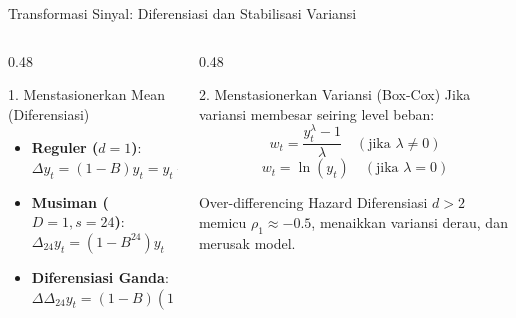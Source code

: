 \documentclass[aspectratio=169, 10pt]{beamer}
\begin{document}
\begin{frame}{Transformasi Sinyal: Diferensiasi dan Stabilisasi Variansi}
    \begin{columns}[T]
        \begin{column}{0.48\textwidth}
            \begin{block}{1. Menstasionerkan Mean (Diferensiasi)}
                \begin{itemize}
                    \item \textbf{Reguler ($d=1$)}: $\Delta y_t = (1-B)y_t = y_t - y_{t-1}$
                    \item \textbf{Musiman ($D=1, s=24$)}: $\Delta_{24} y_t = (1-B^{24})y_t$
                    \item \textbf{Diferensiasi Ganda}: $\Delta \Delta_{24} y_t = (1-B)(1-B^{24})y_t$
                \end{itemize}
            \end{block}
        \end{column}
        \begin{column}{0.48\textwidth}
            \begin{block}{2. Menstasionerkan Variansi (Box-Cox)}
                Jika variansi membesar seiring level beban:
                \[
                    w_t = \frac{y_t^\lambda - 1}{\lambda} \quad (\text{jika } \lambda \neq 0)
                \]
                \[
                    w_t = \ln(y_t) \quad (\text{jika } \lambda = 0)
                \]
            \end{block}
            \begin{alertblock}{Over-differencing Hazard}
                Diferensiasi $d > 2$ memicu $\rho_1 \approx -0.5$, menaikkan variansi derau, dan merusak model.
            \end{alertblock}
        \end{column}
    \end{columns}
\end{frame}
\end{document}
